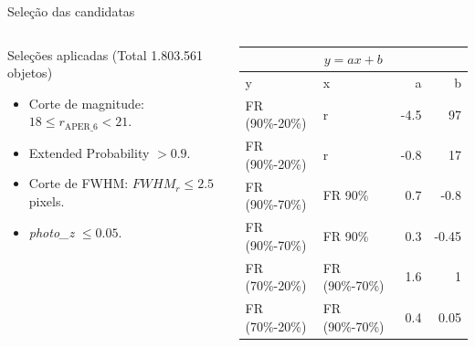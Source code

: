 \begin{frame}[c]{Seleção das candidatas}

\begin{columns}[c]
    \begin{column}{0.48\textwidth}
        \vspace{0.2cm}
        \begin{splusbox}{\tiny Seleções aplicadas (Total 1.803.561 objetos)}
            \tiny
            \begin{itemize}
                \item Corte de magnitude: $18 \leq r_\text{APER\_6} < 21$.
                \item Extended Probability $> 0.9$.
                \item Corte de FWHM: $FWHM_r \leq 2.5$ pixels.
                \item \textit{photo\_z} $\leq 0.05$.
            \end{itemize}
        \end{splusbox}
    \end{column}
    \begin{column}{0.48\textwidth}
        \vspace{0.2cm}    
        \begin{table}[!ht]
            \centering
            \tiny
            \begin{tabular}{l l r r}
                \hline
                \multicolumn{4}{c}{$y = ax + b$}\\
                \hline
                y & x & a & b\\
                \hline
                FR (90\%-20\%) & r & -4.5 & 97 \\
                FR (90\%-20\%) & r & -0.8 & 17 \\
                FR (90\%-70\%) & FR 90\% & 0.7 & -0.8 \\
                FR (90\%-70\%) & FR 90\% & 0.3 & -0.45 \\
                FR (70\%-20\%) & FR (90\%-70\%) & 1.6 & 1 \\
                FR (70\%-20\%) & FR (90\%-70\%) & 0.4 & 0.05 \\
                \hline
            \end{tabular}
            \label{cortes_flux_radius}
        \end{table}
    \end{column}
\end{columns}
\begin{columns}[c]

\end{columns}
\end{frame}
